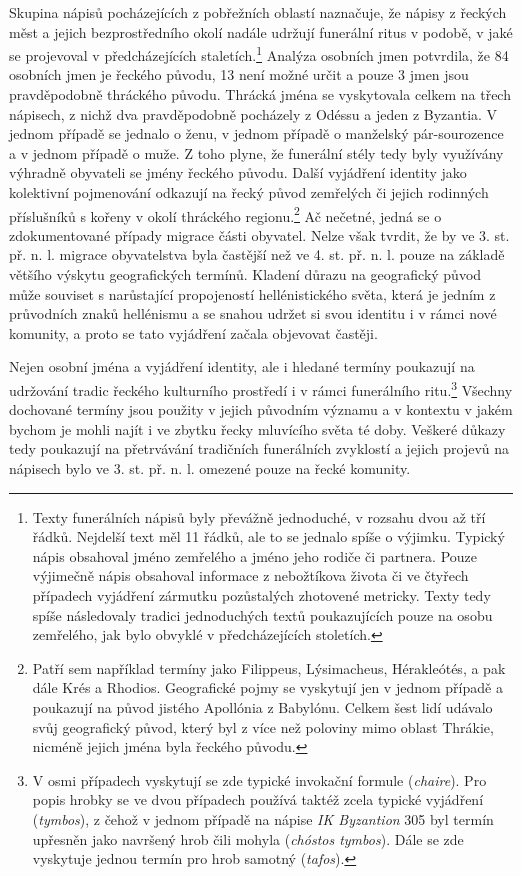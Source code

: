 Skupina nápisů pocházejících z pobřežních oblastí naznačuje, že nápisy z řeckých měst a jejich bezprostředního okolí nadále udržují funerální ritus v podobě, v jaké se projevoval v předcházejících staletích.\footnote{Texty funerálních nápisů byly převážně jednoduché, v rozsahu dvou až tří řádků. Nejdelší text měl 11 řádků, ale to se jednalo spíše o výjimku. Typický nápis obsahoval jméno zemřelého a jméno jeho rodiče či partnera. Pouze výjimečně nápis obsahoval informace z nebožtíkova života či ve čtyřech případech vyjádření zármutku pozůstalých zhotovené metricky. Texty tedy spíše následovaly tradici jednoduchých textů poukazujících pouze na osobu zemřelého, jak bylo obvyklé v předcházejících stoletích.} Analýza osobních jmen potvrdila, že 84  osobních jmen je řeckého původu, 13  není možné určit a pouze 3  jmen jsou pravděpodobně thráckého původu. Thrácká jména se vyskytovala celkem na třech nápisech, z nichž dva pravděpodobně pocházely z Odéssu a jeden z Byzantia. V jednom případě se jednalo o ženu, v jednom případě o manželský pár-sourozence a v jednom případě o muže. Z toho plyne, že funerální stély tedy byly využívány výhradně obyvateli se jmény řeckého původu. Další vyjádření identity jako kolektivní pojmenování odkazují na řecký původ zemřelých či jejich rodinných příslušníků s kořeny v okolí thráckého regionu.\footnote{Patří sem například termíny jako Filippeus, Lýsimacheus, Hérakleótés, a pak dále Krés a Rhodios. Geografické pojmy se vyskytují jen v jednom případě a poukazují na původ jistého Apollónia z Babylónu. Celkem šest lidí udávalo svůj geografický původ, který byl z více než poloviny mimo oblast Thrákie, nicméně jejich jména byla řeckého původu.} Ač nečetné, jedná se o zdokumentované případy migrace části obyvatel. Nelze však tvrdit, že by ve 3. st. př. n. l. migrace obyvatelstva byla častější než ve 4. st. př. n. l. pouze na základě většího výskytu geografických termínů. Kladení důrazu na geografický původ může souviset s narůstající propojeností hellénistického světa, která je jedním z průvodních znaků hellénismu a se snahou udržet si svou identitu i v rámci nové komunity, a proto se tato vyjádření začala objevovat častěji.

Nejen osobní jména a vyjádření identity, ale i hledané termíny poukazují na udržování tradic řeckého kulturního prostředí i v rámci funerálního ritu.\footnote{V osmi případech vyskytují se zde typické invokační formule ({\em chaire}). Pro popis hrobky se ve dvou případech používá taktéž zcela typické vyjádření ({\em tymbos}), z čehož v jednom případě na nápise {\em IK Byzantion} 305 byl termín upřesněn jako navršený hrob čili mohyla ({\em chóstos tymbos}). Dále se zde vyskytuje jednou termín pro hrob samotný ({\em tafos}).} Všechny dochované termíny jsou použity v jejich původním významu a v kontextu v jakém bychom je mohli najít i ve zbytku řecky mluvícího světa té doby. Veškeré důkazy tedy poukazují na přetrvávání tradičních funerálních zvyklostí a jejich projevů na nápisech bylo ve 3. st. př. n. l. omezené pouze na řecké komunity.


